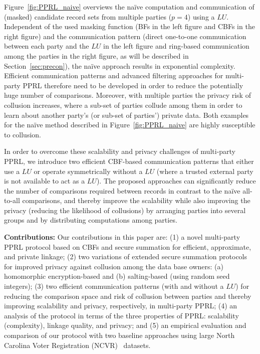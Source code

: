 \documentclass{sig-alternate}
\begin{document}
Figure~\ref{fig:PPRL_naive} overviews the na\"{i}ve computation and communication of (masked) candidate record sets from multiple parties ($p=4$) using a $LU$. Independent of the used masking function (BFs in the left figure and CBFs in the right figure) and the communication pattern (direct one-to-one communication between each party and the $LU$ in the left figure and ring-based communication among the parties in the right figure, as will be described in Section~\ref{sec:precon}), the na\"{i}ve approach results in exponential complexity.
Efficient communication patterns and advanced filtering approaches for multi-party PPRL therefore need to be developed in order to reduce the potentially huge number of comparisons. 
Moreover, with multiple parties the privacy risk of collusion increases, where a sub-set of parties collude among them in order to learn about another party's (or sub-set of parties') private data. Both examples for the na\"{i}ve method described in Figure~\ref{fig:PPRL_naive} are highly susceptible to collusion. 

In order to overcome these scalability and privacy challenges of multi-party PPRL, we introduce two efficient CBF-based communication patterns that either use a $LU$ or operate symmetrically without a $LU$ (where a trusted external party is not available to act as a $LU$). The proposed approaches can significantly reduce the number of comparisons required between records in contrast to the na\"{i}ve all-to-all comparisons, and thereby improve the scalability while also improving the privacy (reducing the likelihood of collusions) by arranging parties into several groups and by distributing computations among parties.

\smallskip
\textbf{Contributions:}
Our contributions in this paper are: (1) a novel multi-party PPRL protocol based on CBFs and secure summation for efficient, approximate, and private linkage; (2) two variations of extended secure summation protocols for improved privacy against collusion among the data base owners: (a) homomorphic encryption-based and (b) salting-based (using random seed integers); (3) two efficient communication patterns (with and without a $LU$) for reducing the comparison space and risk of collusion between parties and thereby improving scalability and privacy, respectively, in multi-party PPRL; (4) an analysis of the protocol in terms of the three properties of PPRL: scalability (complexity), linkage quality, and privacy; and (5) an empirical evaluation and comparison of our protocol with two baseline approaches using large North Carolina Voter Registration (NCVR)~\cite{Chr13NC} datasets.
\end{document}
